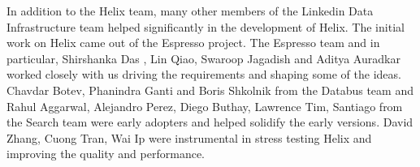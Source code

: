In addition to the Helix team, many other members of the Linkedin Data Infrastructure team helped significantly in the development of Helix. 
The initial work on Helix came out of the Espresso project. The Espresso team and in particular, Shirshanka Das
, Lin Qiao, Swaroop Jagadish and Aditya Auradkar worked closely with us driving
the requirements and shaping some of the ideas. Chavdar Botev, Phanindra Ganti and Boris Shkolnik
from the Databus team and Rahul Aggarwal, Alejandro Perez, Diego Buthay, Lawrence Tim, Santiago from the Search team were 
early adopters and helped solidify the early versions. David Zhang, Cuong Tran, Wai Ip were instrumental in stress
testing Helix and improving the quality and performance.